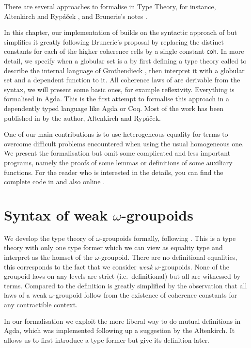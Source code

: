 There are several approaches to formalise {\wog} in Type Theory, for instance, Altenkirch and Ryp\'a\v{c}ek \cite{txa:csl}, and Brunerie's notes \cite{gb:wog}.

In this chapter, our implementation of \wog builds on the syntactic approach of
\cite{txa:csl} but simplifies it greatly following Brunerie's proposal
\cite{gb:wog} by replacing the distinct constants for each of the
higher coherence cells by a single constant $\mathsf{coh}$. In more detail, we
specify when a globular set is a {\wogs} by first defining a type
theory called {\tig} to describe the internal language of Grothendieck
{\wog}, then interpret it with a globular set and a dependent
function to it. All coherence laws of {\wog} are derivable from the
syntax, we will present some basic ones, for example reflexivity. Everything
is formalised in Agda. This is the first attempt to formalise this approach in a
dependently typed language like Agda or Coq. 
Most of the work has been published in \cite{LFMTP14} by the author, Altenkirch and  Ryp\'a\v{c}ek.

One of our main contributions is to use heterogeneous
equality for terms to overcome difficult problems encountered
when using the usual homogeneous one. We present the formalisation but
omit some complicated and less important programs, namely the
proofs of some lemmas or definitions of some auxiliary functions. For the reader who is interested in the details, you can find the complete code in  and also online \cite{lfmtp-github}. 


\section{Syntax of weak {\Large$\omega$}-groupoids}\label{sec:syntax}
%
We develop the type theory of $\omega$-groupoids formally, following
\cite{gb:wog}. This is a type theory with only one type former which
we can view as equality type and interpret as the homset of the
$\omega$-groupoid. There are no definitional equalities, this
corresponds to the fact that we consider \emph{weak} $\omega$-groupoids. None of the groupoid laws on any levels are strict (i.e.\ definitional) but all are witnessed by
terms. Compared to \cite{txa:csl} the definition is greatly
simplified by the observation that all laws of a weak $\omega$-groupoid follow from the existence of coherence constants for
any contractible context.

In our formalisation we exploit the more liberal way to do mutual
definitions in Agda, which was implemented following up a
suggestion by the Altenkirch. It allows us to first introduce a type
former but give its definition later.

